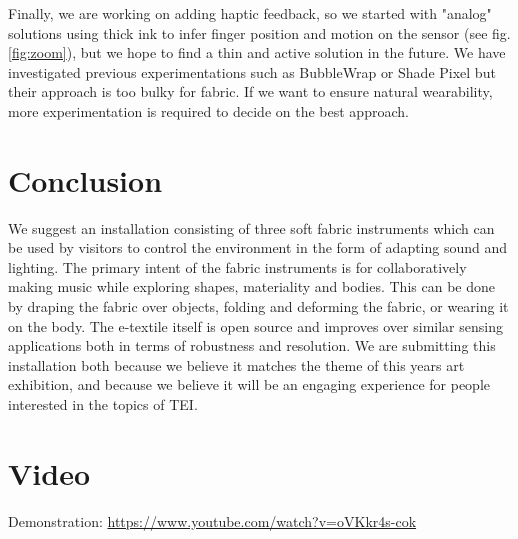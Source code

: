 \documentclass{sigchi-ext}
\begin{document}
Finally, we are working on adding haptic feedback, so we started with "analog" solutions using thick ink to infer finger position and motion on the sensor (see fig. \ref{fig:zoom}), but we hope to find a thin and active solution in the future.
We have investigated previous experimentations such as BubbleWrap \cite{bubblewrap} or Shade Pixel \cite{shadepixel} but their approach is too bulky for fabric. If we want to ensure natural wearability, more experimentation is required to decide on the best approach.


\section{Conclusion}
We suggest an installation consisting of three soft fabric instruments which can be used by visitors to control the environment in the form of adapting sound and lighting. The primary intent of the fabric instruments is for collaboratively making music while exploring shapes, materiality and bodies. This can be done by draping the fabric over objects, folding and deforming the fabric, or wearing it on the body. The e-textile itself is open source and improves over similar sensing applications both in terms of robustness and resolution. We are submitting this installation both because we believe it matches the theme of this years art exhibition, and because we believe it will be an engaging experience for people interested in the topics of TEI.


\section{Video}

Demonstration: \url{https://www.youtube.com/watch?v=oVKkr4s-cok}


\balance{}



\end{document}
